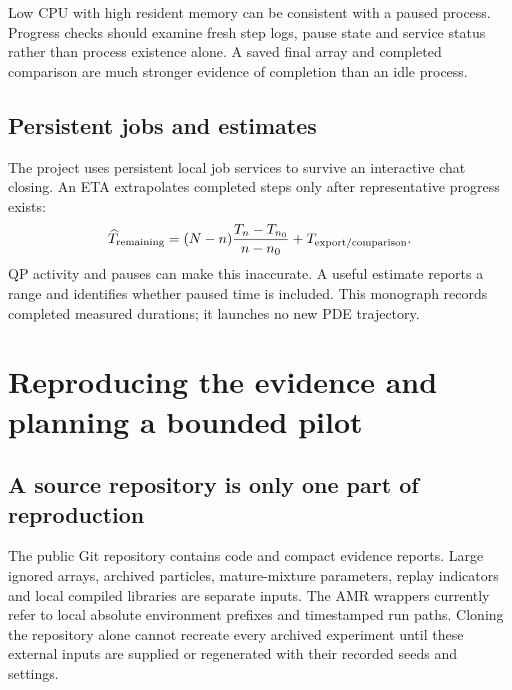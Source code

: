 Low CPU with high resident memory can be consistent with a paused process. Progress checks should examine fresh step logs, pause state and service status rather than process existence alone. A saved final array and completed comparison are much stronger evidence of completion than an idle process.

\section{Persistent jobs and estimates}
The project uses persistent local job services to survive an interactive chat closing. An ETA extrapolates completed steps only after representative progress exists:
\begin{equation}
 \widehat T_{\rm remaining}=(N-n)\frac{T_n-T_{n_0}}{n-n_0}+T_{\rm export/comparison}.
\end{equation}
QP activity and pauses can make this inaccurate. A useful estimate reports a range and identifies whether paused time is included. This monograph records completed measured durations; it launches no new PDE trajectory.

\chapter{Reproducing the evidence and planning a bounded pilot}
\section{A source repository is only one part of reproduction}
The public Git repository contains code and compact evidence reports. Large ignored arrays, archived particles, mature-mixture parameters, replay indicators and local compiled libraries are separate inputs. The AMR wrappers currently refer to local absolute environment prefixes and timestamped run paths. Cloning the repository alone cannot recreate every archived experiment until these external inputs are supplied or regenerated with their recorded seeds and settings.

